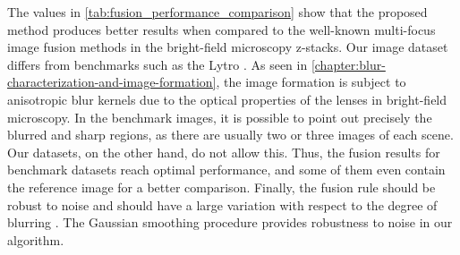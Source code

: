 The values in \autoref{tab:fusion_performance_comparison} show that the proposed method produces better results when compared to the well-known multi-focus image fusion methods in the bright-field microscopy z-stacks. Our image dataset differs from benchmarks such as the Lytro \cite{nejati2015multi}. As seen in \autoref{chapter:blur-characterization-and-image-formation}, the image formation is subject to anisotropic blur kernels due to the optical properties of the lenses in bright-field microscopy. In the benchmark images, it is possible to point out precisely the blurred and sharp regions, as there are usually two or three images of each scene. Our datasets, on the other hand, do not allow this. Thus, the fusion results for benchmark datasets reach optimal performance, and some of them even contain the reference image for a better comparison. Finally, the fusion rule should be robust to noise and should have a large variation with respect to the degree of blurring \cite{huang2007evaluation}. The Gaussian smoothing procedure provides robustness to noise in our algorithm. 